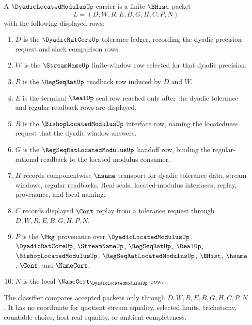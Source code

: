 \begin{definition}
\label{def:dyadic-located-modulus-carrier}
A $\DyadicLocatedModulusUp$ carrier is a finite $\BHist$ packet
$$
L=(D,W,R,E,B,G,H,C,P,N)
$$
with the following displayed rows:
\begin{enumerate}
\item $D$ is the $\DyadicRatCoreUp$ tolerance ledger, recording the dyadic precision request and slack comparison rows.
\item $W$ is the $\StreamNameUp$ finite-window row selected for that dyadic precision.
\item $R$ is the $\RegSeqRatUp$ readback row induced by $D$ and $W$.
\item $E$ is the terminal $\RealUp$ seal row reached only after the dyadic tolerance and regular readback rows are displayed.
\item $B$ is the $\BishopLocatedModulusUp$ interface row, naming the locatedness request that the dyadic window answers.
\item $G$ is the $\RegSeqRatLocatedModulusUp$ handoff row, binding the regular-rational readback to the located-modulus consumer.
\item $H$ records componentwise $\hsame$ transport for dyadic tolerance data, stream windows, regular readbacks, Real seals, located-modulus interfaces, replay, provenance, and local naming.
\item $C$ records displayed $\Cont$ replay from a tolerance request through $D,W,R,E,B,G,H,P,N$.
\item $P$ is the $\Pkg$ provenance over $\DyadicLocatedModulusUp$, $\DyadicRatCoreUp$, $\StreamNameUp$, $\RegSeqRatUp$, $\RealUp$, $\BishopLocatedModulusUp$, $\RegSeqRatLocatedModulusUp$, $\BHist$, $\hsame$, $\Cont$, and $\NameCert$.
\item $N$ is the local $\NameCert_{\DyadicLocatedModulusUp}$ row.
\end{enumerate}
The classifier compares accepted packets only through $D,W,R,E,B,G,H,C,P,N$. It has no coordinate for quotient stream equality, selected limits, trichotomy, countable choice, host real equality, or ambient completeness.
\end{definition}

